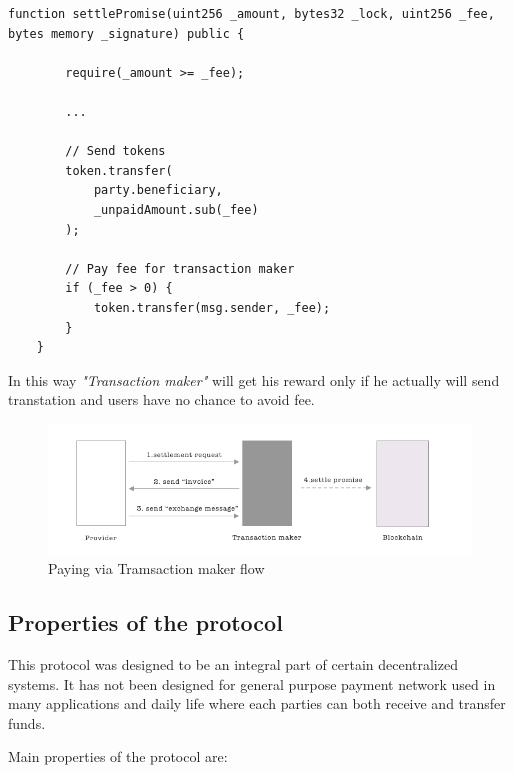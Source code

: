 \documentclass[a4paper,12pt]{article}
\begin{document}
\begin{lstlisting}[language=Solidity]
    function settlePromise(uint256 _amount, bytes32 _lock, uint256 _fee, bytes memory _signature) public {

        require(_amount >= _fee);
        
        ...

        // Send tokens
        token.transfer(
            party.beneficiary, 
            _unpaidAmount.sub(_fee)
        );

        // Pay fee for transaction maker
        if (_fee > 0) {
            token.transfer(msg.sender, _fee);
        }
    }
\end{lstlisting}

In this way \textit{"Transaction maker"} will get his reward only if he actually 
will send transtation and users have no chance to avoid fee.

\begin{figure}[H]
    \centering
    \includegraphics[scale=0.5]{../img/transactor-payment}
    \caption{Paying via Tramsaction maker flow}
    \label{img:transactor-payment}
\end{figure}

\subsection{Properties of the protocol}

This protocol was designed to be an integral part of certain decentralized systems. 
It has not been designed for general purpose payment network used in many 
applications and daily life where each parties can both receive and transfer funds.

Main properties of the protocol are:
\end{document}
